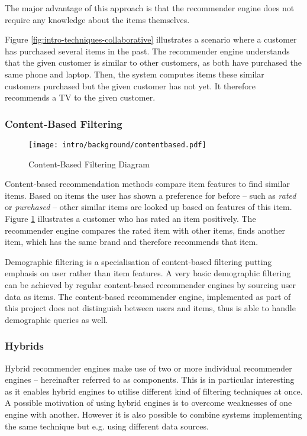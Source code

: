 The major advantage of this approach is that the recommender engine does not require any knowledge about the items themselves.

Figure \ref{fig:intro-techniques-collaborative} illustrates a scenario where a customer has purchased several items in the past. The recommender engine understands that the given customer is similar to other customers, as both have purchased the same phone and laptop. Then, the system computes items these similar customers purchased but the given customer has not yet. It therefore recommends a TV to the given customer.

\subsubsection{Content-Based Filtering}

\begin{figure}[ht]
    \texttt{[image: intro/background/contentbased.pdf]}
    \caption{Content-Based Filtering Diagram}
    \label{fig:intro-techniques-contentbased}
\end{figure}

Content-based recommendation methods compare item features to find similar items. Based on items the user has shown a preference for before -- such as \emph{rated} or \emph{purchased} -- other similar items are looked up based on features of this item. Figure \ref{fig:intro-techniques-contentbased} illustrates a customer who has rated an item positively. The recommender engine compares the rated item with other items, finds another item, which has the same brand and therefore recommends that item.

Demographic filtering is a specialisation of content-based filtering putting emphasis on user rather than item features. A very basic demographic filtering can be achieved by regular content-based recommender engines by sourcing user data as items. The content-based recommender engine, implemented as part of this project does not distinguish between users and items, thus is able to handle demographic queries as well.

\subsubsection{Hybrids}
\label{intro-bg-tech-hybrid}

Hybrid recommender engines make use of two or more individual recommender engines -- hereinafter referred to as components. This is in particular interesting as it enables hybrid engines to utilise different kind of filtering techniques at once. A possible motivation of using hybrid engines is to overcome weaknesses of one engine with another. However it is also possible to combine systems implementing the same technique but e.g. using different data sources.

